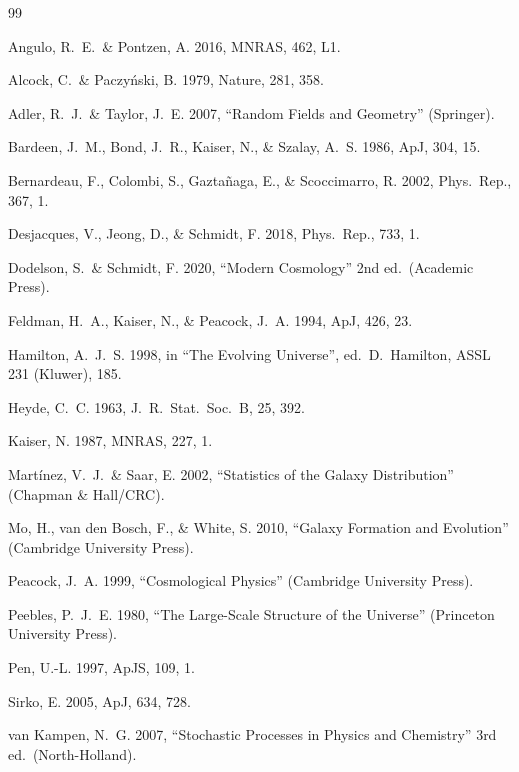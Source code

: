 \documentclass[12pt]{article}
\begin{document}
\begin{thebibliography}{99}

Angulo, R.~E.\ \& Pontzen, A. 2016, MNRAS, 462, L1.

Alcock, C.\ \& Paczy\'nski, B. 1979, Nature, 281, 358.

Adler, R.~J.\ \& Taylor, J.~E. 2007, ``Random Fields and Geometry''
(Springer).

Bardeen, J.~M., Bond, J.~R., Kaiser, N., \& Szalay, A.~S. 1986,
ApJ, 304, 15.

Bernardeau, F., Colombi, S., Gazta\~naga, E., \& Scoccimarro, R. 2002,
Phys.\ Rep., 367, 1.

Desjacques, V., Jeong, D., \& Schmidt, F. 2018, Phys.\ Rep., 733, 1.

Dodelson, S.\ \& Schmidt, F. 2020, ``Modern Cosmology'' 2nd ed.\
(Academic Press).

Feldman, H.~A., Kaiser, N., \& Peacock, J.~A. 1994, ApJ, 426, 23.

Hamilton, A.~J.~S. 1998, in ``The Evolving Universe'', ed.\ D.~Hamilton,
ASSL 231 (Kluwer), 185.

Heyde, C.~C. 1963, J.~R.\ Stat.\ Soc.\ B, 25, 392.

Kaiser, N. 1987, MNRAS, 227, 1.

Mart\'inez, V.~J.\ \& Saar, E. 2002, ``Statistics of the Galaxy
Distribution'' (Chapman \& Hall/CRC).

Mo, H., van den Bosch, F., \& White, S. 2010, ``Galaxy Formation
and Evolution'' (Cambridge University Press).

Peacock, J.~A. 1999, ``Cosmological Physics'' (Cambridge
University Press).

Peebles, P.~J.~E. 1980, ``The Large-Scale Structure of the Universe''
(Princeton University Press).

Pen, U.-L. 1997, ApJS, 109, 1.

Sirko, E. 2005, ApJ, 634, 728.

van Kampen, N.~G. 2007, ``Stochastic Processes in Physics and
Chemistry'' 3rd ed.\ (North-Holland).

\end{thebibliography}
\end{document}
